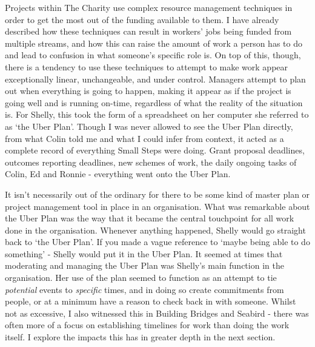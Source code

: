 Projects within The Charity use complex resource management techniques in order to get the most out of the funding available to them. I have already described how these techniques can result in workers’ jobs being funded from multiple streams, and how this can raise the amount of work a person has to do and lead to confusion in what someone’s specific role is. On top of this, though, there is a tendency to use these techniques to attempt to make work appear exceptionally linear, unchangeable, and under control. Managers attempt to plan out when everything is going to happen, making it appear as if the project is going well and is running on-time, regardless of what the reality of the situation is. For Shelly, this took the form of a spreadsheet on her computer she referred to as ‘the Uber Plan’. Though I was never allowed to see the Uber Plan directly, from what Colin told me and what I could infer from context, it acted as a complete record of everything Small Steps were doing. Grant proposal deadlines, outcomes reporting deadlines, new schemes of work, the daily ongoing tasks of Colin, Ed and Ronnie - everything went onto the Uber Plan. 

It isn’t necessarily out of the ordinary for there to be some kind of master plan or project management tool in place in an organisation. What was remarkable about the Uber Plan was the way that it became the central touchpoint for all work done in the organisation. Whenever anything happened, Shelly would go straight back to ‘the Uber Plan’. If you made a vague reference to ‘maybe being able to do something’ - Shelly would put it in the Uber Plan.  It seemed at times that moderating and managing the Uber Plan was Shelly’s main function in the organisation. Her use of the plan seemed to function as an attempt to tie \textit{potential} events to \textit{specific} times, and in doing so create commitments from people, or at a minimum have a reason to check back in with someone. Whilst not as excessive, I also witnessed this in Building Bridges and Seabird - there was often more of a focus on establishing timelines for work than doing the work itself. I explore the impacts this has in greater depth in the next section. 

